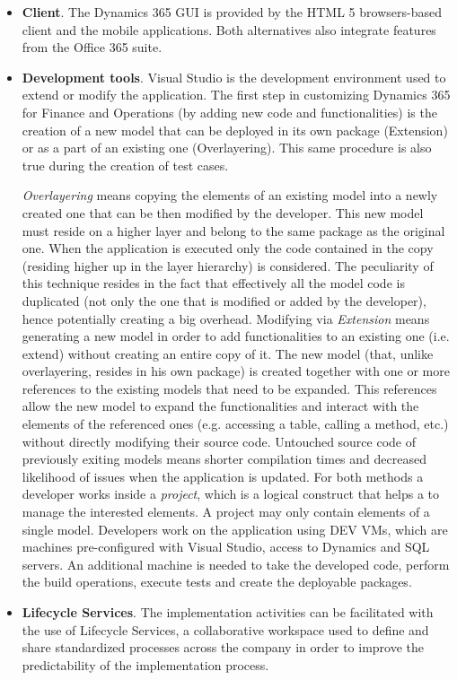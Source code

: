 \begin{itemize}
    \item \textbf{Client}. The Dynamics 365 GUI is provided by the HTML 5 browsers-based client and the mobile applications. Both alternatives also integrate features from the Office 365 suite.
    
    \item \textbf{Development tools}. Visual Studio is the development environment used to extend or modify the application. The first step in customizing Dynamics 365 for Finance and Operations (by adding new code and functionalities) is the creation of a new model that can be deployed in its own package (Extension) or as a part of an existing one (Overlayering). This same procedure is also true during the creation of test cases.
    
    \textit{Overlayering} means copying the elements of an existing model into a newly created one that can be then modified by the developer. This new model must reside on a higher layer and belong to the same package as the original one. When the application is executed only the code contained in the copy (residing higher up in the layer hierarchy) is considered. The peculiarity of this technique resides in the fact that effectively all the model code is duplicated (not only the one that is modified or added by the developer), hence potentially creating a big overhead. Modifying via \textit{Extension} means generating a new model in order to add functionalities to an existing one (i.e. extend) without creating an entire copy of it. The new model (that, unlike overlayering, resides in his own package) is created together with one or more references to the existing models that need to be expanded. This references allow the new model to expand the functionalities and interact with the elements of the referenced ones (e.g. accessing a table, calling a method, etc.) without directly modifying their source code. Untouched source code of previously exiting models means shorter compilation times and decreased likelihood of issues when the application is updated. For both methods a developer works inside a \textit{project}, which is a logical construct that helps a to manage the interested elements. A project may only contain elements of a single model. Developers work on the application using DEV VMs, which are machines pre-configured with Visual Studio, access to Dynamics and SQL servers. An additional machine is needed to take the developed code, perform the build operations, execute tests and create the deployable packages.
    
    \item \textbf{Lifecycle Services}. The implementation activities can be facilitated with the use of Lifecycle Services, a collaborative workspace used to define and share standardized processes across the company in order to improve the predictability of the implementation process.
\end{itemize}

